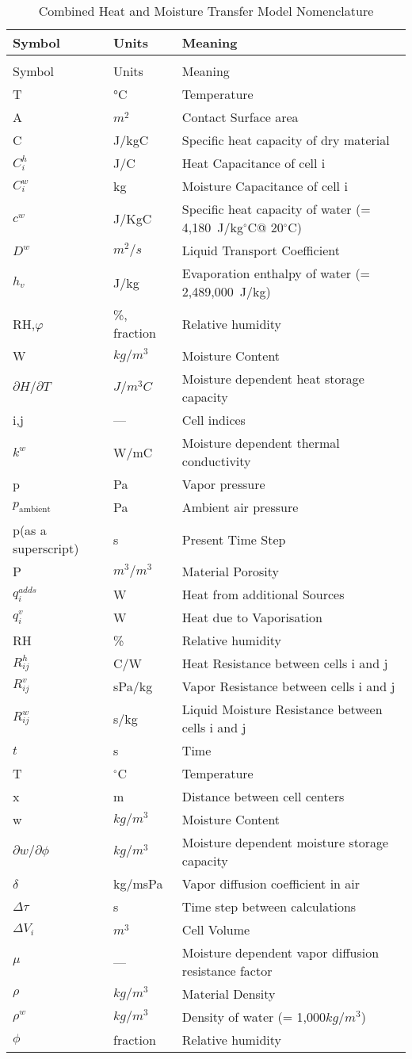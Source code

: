 \begin{longtable}[c]{p{1.5in}p{1.0in}p{3.5in}}
\caption{Combined Heat and Moisture Transfer Model Nomenclature \label{table:combined-heat-and-moisture-transfer-model}} \tabularnewline
\toprule 
Symbol & Units & Meaning \tabularnewline
\midrule
\endfirsthead

\caption[]{Combined Heat and Moisture Transfer Model Nomenclature} \tabularnewline
\toprule 
Symbol & Units & Meaning \tabularnewline
\midrule
\endhead

T & \si{\celsius} & Temperature \tabularnewline
A & $m^2$ & Contact Surface area \tabularnewline
C & J/kgC & Specific heat capacity of dry material \tabularnewline
$C_i^h$ & J/C & Heat Capacitance of cell i \tabularnewline
$C_i^w$ & kg & Moisture Capacitance of cell i \tabularnewline
$c^{w}$ & J/KgC & Specific heat capacity of water (= 4,180~J/kg$^{\circ}$C@ 20$^{\circ}$C) \tabularnewline
${D^w}$ & $m^2/s$ & Liquid Transport Coefficient \tabularnewline
${h_v}$ & J/kg & Evaporation enthalpy of water (= 2,489,000~J/kg) \tabularnewline
RH,$\varphi$ & \%, fraction & Relative humidity \tabularnewline
W & $kg/m^3$ & Moisture Content \tabularnewline
$\partial{H}/\partial{T}$ & $J/m^3C$ & Moisture dependent heat storage capacity \tabularnewline
i,j & --- & Cell indices \tabularnewline
${k^w}$ & W/mC & Moisture dependent thermal conductivity \tabularnewline
p & Pa & Vapor pressure \tabularnewline
$p_{\text{ambient}}$ & Pa & Ambient air pressure \tabularnewline
p(as a superscript) & s & Present Time Step \tabularnewline
P & $m^3/m^3$ & Material Porosity \tabularnewline
${q_i^{adds}}$ & W & Heat from additional Sources \tabularnewline
${q_i^v}$ & W & Heat due to Vaporisation \tabularnewline
RH & \% & Relative humidity \tabularnewline
$R_{ij}^h$ & C/W & Heat Resistance between cells i and j \tabularnewline
$R_{ij}^v$ & sPa/kg & Vapor Resistance between cells i and j \tabularnewline
$R_{ij}^w$ & s/kg & Liquid Moisture Resistance between cells i and j \tabularnewline
$t$ & s & Time \tabularnewline
T & $^\circ$C & Temperature \tabularnewline
x & m & Distance between cell centers \tabularnewline
w & $kg/m^3$ & Moisture Content \tabularnewline
$\partial{w}/\partial{\phi}$ & $kg/m^3$ & Moisture dependent moisture storage capacity \tabularnewline
$\delta$ & kg/msPa & Vapor diffusion coefficient in air \tabularnewline
$\Delta \tau$ & s & Time step between calculations \tabularnewline
$\Delta {V_i}$ & $m^3$ & Cell Volume \tabularnewline
$\mu$ & --- & Moisture dependent vapor diffusion resistance factor \tabularnewline
$\rho$ & $kg/m^3$ & Material Density \tabularnewline
${\rho}^w$ & $kg/m^3$ & Density of water (= 1,000$kg/m^3$) \tabularnewline
$\phi$ & fraction & Relative humidity \tabularnewline
\bottomrule
\end{longtable}

